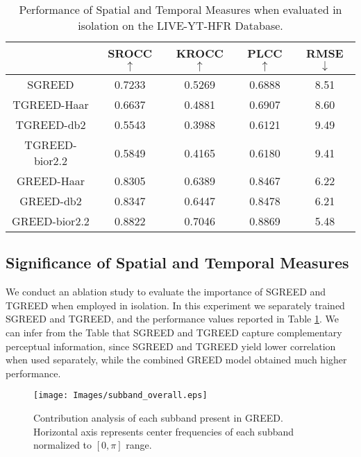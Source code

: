 \documentclass[journal]{IEEEtran}
\begin{document}
\begin{table}[t]
\caption{Performance of Spatial and Temporal Measures when evaluated in isolation on the LIVE-YT-HFR Database.}
    \label{Table:individual_component}
    \centering
    \footnotesize
    \begin{tabular}{|c||c|c|c|c|}
        \hline
        ~    & SROCC $\uparrow$ & KROCC $\uparrow$ & PLCC $\uparrow$ & RMSE $\downarrow$ \\ \hline \hline
        SGREED & 0.7233 & 0.5269 & 0.6888 & 8.51 \\ 
        TGREED-Haar & 0.6637 & 0.4881 & 0.6907 & 8.60 \\ 
        TGREED-db2 & 0.5543 & 0.3988 & 0.6121 & 9.49 \\
        TGREED-bior2.2 & 0.5849 & 0.4165 & 0.6180 & 9.41 \\ \hline
        GREED-Haar & 0.8305 & 0.6389 & 0.8467 & 6.22 \\
        GREED-db2 & 0.8347 & 0.6447 & 0.8478 & 6.21 \\
        GREED-bior2.2 & 0.8822 & 0.7046 & 0.8869 & 5.48 \\
        \hline
    \end{tabular}
\end{table}

\subsection{Significance of Spatial and Temporal Measures}
We conduct an ablation study to evaluate the importance of SGREED and TGREED when employed in isolation. In this experiment we separately trained SGREED and TGREED, and the performance values reported in Table \ref{Table:individual_component}. We can infer from the Table that SGREED and TGREED capture complementary perceptual information, since SGREED and TGREED yield lower correlation when used separately, while the combined GREED model obtained much higher performance.

\begin{figure}[t]
    \centering
    \texttt{[image: Images/subband\_overall.eps]}
    \caption{Contribution analysis of each subband present in GREED. Horizontal axis represents center frequencies of each subband normalized to $[0,\pi]$ range.}
    \label{fig:subband_overall}
\end{figure}
\end{document}
